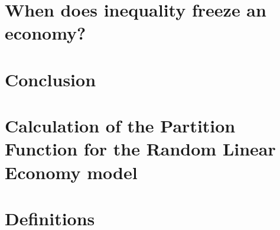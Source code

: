 \documentclass[
  oneside,
  11pt, a4paper,
  footinclude=true,
  headinclude=true,
  cleardoublepage=empty
]{scrbook}
\begin{document}


\chapter{When does inequality freeze an economy?}


\chapter{Conclusion}

\appendix

\chapter{Calculation of the Partition Function for the Random Linear
  Economy model} 
\label{sec:appendix_replica}



\chapter{Definitions}
\label{app:stat}



{}

    
\end{document}
